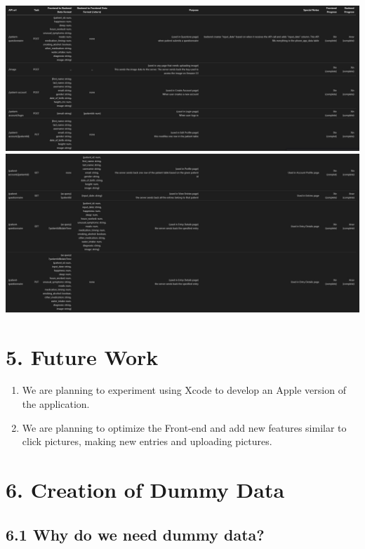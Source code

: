 \documentclass[]{book}
\providecommand{\tightlist}{%
  \setlength{\itemsep}{0pt}\setlength{\parskip}{0pt}}
\begin{document}
\includegraphics{./phone_app_doc_images/api_table_one.JPG}
\includegraphics{./phone_app_doc_images/api_table_two.JPG}

\section{5. Future Work}\label{future-work-1}

\begin{enumerate}
\def\labelenumi{\arabic{enumi})}
\tightlist
\item
  We are planning to experiment using Xcode to develop an Apple version
  of the application.
\item
  We are planning to optimize the Front-end and add new features similar
  to click pictures, making new entries and uploading pictures.
\end{enumerate}

\section{6. Creation of Dummy Data}\label{creation-of-dummy-data-1}

\subsection{6.1 Why do we need dummy
data?}\label{why-do-we-need-dummy-data-1}
\end{document}
